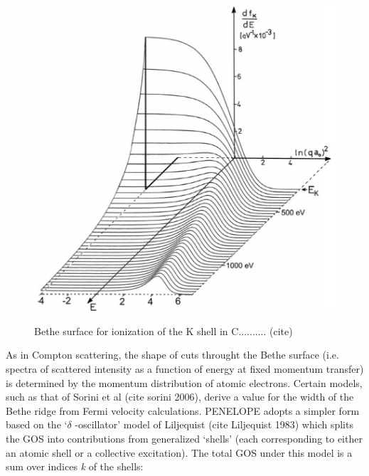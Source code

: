 \documentclass [11pt, proquest, article] {uwthesis}[2016/11/22]
\begin{document}
\begin{figure}[h] 
\caption{Bethe surface for ionization of the K shell in C.......... (cite)}
\centering
\includegraphics[scale=0.5]{../Figures/bethe.png}
\label{fig:bethe}
\end{figure}

As in Compton scattering, the shape of cuts throught the Bethe surface (i.e. spectra of scattered intensity as a function of energy at fixed momentum transfer) is determined by the momentum distribution of atomic electrons. Certain models, such as that of Sorini et al (cite sorini 2006), derive a value for the width of the Bethe ridge from Fermi velocity calculations. PENELOPE adopts a simpler form based on the `$\delta$ -oscillator' model of Liljequist (cite Liljequist 1983) which splits the GOS into contributions from generalized `shells' (each corresponding to either an atomic shell or a collective excitation). The total GOS under this model is a sum over indices \emph{k} of the shells:
\end{document}
